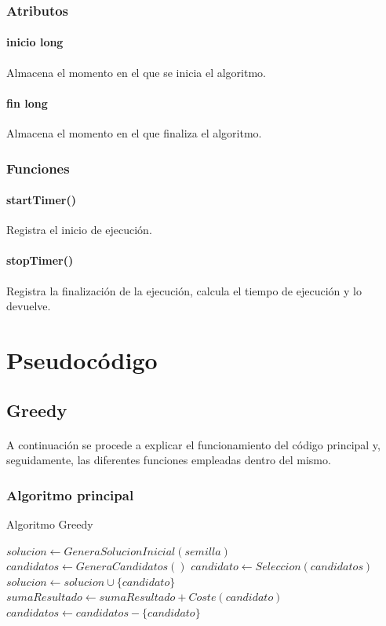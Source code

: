 \documentclass{article}
\begin{document}
	\subsubsection{Atributos}
	
	\paragraph{inicio long}Almacena el momento en el que se inicia el algoritmo.
	
	\paragraph{fin long}Almacena el momento en el que finaliza el algoritmo.
	
	\subsubsection{Funciones}
	
	\paragraph{startTimer()}Registra el inicio de ejecución.
	
	\paragraph{stopTimer()}Registra la finalización de la ejecución, calcula el tiempo de ejecución y lo devuelve.
	
	\section{Pseudocódigo}
	
	\subsection{Greedy}
	
		\paragraph{}A continuación se procede a explicar el funcionamiento del código principal y, seguidamente, las diferentes funciones empleadas dentro del mismo.
	
	\subsubsection{Algoritmo principal}
		\begin{algorithm}[H]
			\caption{Algoritmo Greedy}
			\begin{algorithmic}
				\STATE $solucion \leftarrow GeneraSolucionInicial(semilla)$
				\STATE $candidatos \leftarrow GeneraCandidatos()$
				\STATE $candidato \leftarrow Seleccion(candidatos)$
				\STATE $solucion \leftarrow solucion \cup \{candidato\}$
				\STATE $sumaResultado \leftarrow sumaResultado + Coste(candidato)$
				\ENDIF
				\STATE $candidatos \leftarrow candidatos - \{ candidato \}$
				\ENDWHILE
			\end{algorithmic}
		\end{algorithm}
	
\end{document}
